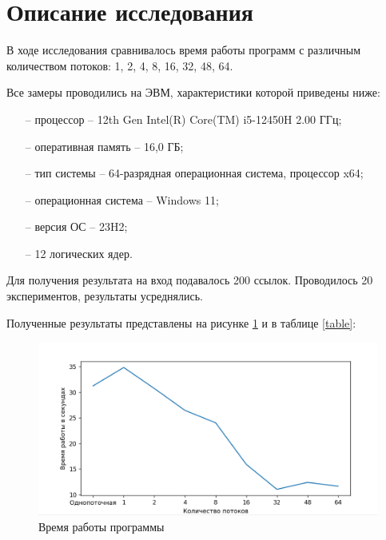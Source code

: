 \documentclass{article}
\begin{document}
\clearpage\section{Описание исследования}
В ходе исследования сравнивалось время работы программ с различным количеством потоков: 1, 2, 4, 8, 16, 32, 48, 64.

Все замеры проводились на ЭВМ, характеристики которой приведены ниже:
\begin{itemize}
	\item[--] процессор -- 12th Gen Intel(R) Core(TM) i5-12450H   2.00 ГГц;
	\item[--] оперативная память -- 16,0 ГБ;
	\item[--] тип системы -- 64-разрядная операционная система, процессор x64;
	\item[--] операционная система -- Windows 11;
	\item[--] версия ОС -- 23H2;
	\item[--] 12 логических ядер.
\end{itemize}

Для получения результата на вход подавалось 200 ссылок. Проводилось 20 экспериментов, результаты усреднялись.

Полученные результаты представлены на рисунке \ref{time} и в таблице \ref{table}:
\begin{figure}[h]
	\centering
	\includegraphics[scale=0.8]{tools/time.png}
	\caption{Время работы программы}
	\label{time}
\end{figure}
\end{document}
